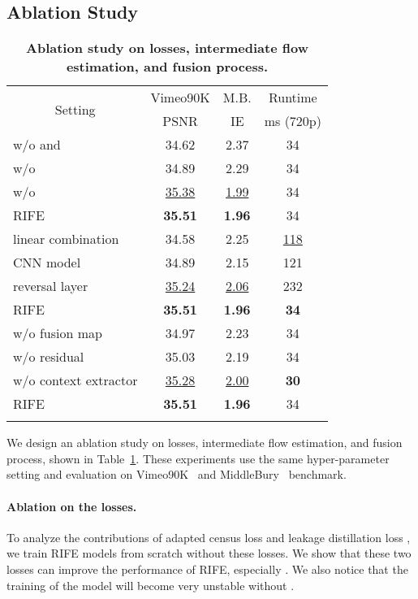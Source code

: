 \documentclass[10pt,twocolumn,letterpaper]{article}
\def\red#1{\textcolor{MyRed}{#1}}
\def\blue#1{\textcolor{MyBlue}{#1}}
\def\first#1{\red{\textbf{#1}}}
\def\second#1{\blue{\underline{#1}}}
\begin{document}
\subsection{Ablation Study}
\label{sec:model_ablation}

\begin{table}[t]
	\caption{\textbf{Ablation study on losses, intermediate flow estimation, and fusion process.}
	}
\label{tab:ablation2}
\small
\begin{tabular}{lccc}
\hline
\multicolumn{1}{c}{\multirow{2}{*}{Setting}} & \multicolumn{1}{c}{Vimeo90K} & \multicolumn{1}{c}{M.B.} & \multicolumn{1}{c}{Runtime} \\ 
\multicolumn{1}{c}{}                         & \multicolumn{1}{c}{PSNR}   & \multicolumn{1}{c}{IE}     & \multicolumn{1}{c}{ms (720p)}            \\ \hline 
w/o  and  & 34.62 & 2.37 & 34\\
w/o  & 34.89 & 2.29 & 34\\
w/o  &   \second{35.38} & \second{1.99} & 34 \\
RIFE & \first{35.51} & \first{1.96} & 34 \\ \hline \hline
linear combination~\cite{jiang2018super} & 34.58 & 2.25 & \second{118} \\
CNN model &  34.89 & 2.15 & 121 \\
reversal layer~\cite{xu2019quadratic} &  \second{35.24} & \second{2.06} & 232 \\
RIFE  & \first{35.51} & \first{1.96} & \first{34} \\ \hline \hline
w/o fusion map & 34.97 & 2.23 &  34 \\
w/o residual & 35.03 & 2.19 &  34 \\
w/o context extractor & \second{35.28} & \second{2.00} & \first{30}\\ 
RIFE & \first{35.51} & \first{1.96} & 34 \\
\hline 
\normalsize
\vspace{-1em}
\end{tabular}
\end{table}


We design an ablation study on losses, intermediate flow estimation, and fusion process, shown in Table~\ref{tab:ablation2}. These experiments use the same hyper-parameter setting and evaluation on Vimeo90K~\cite{xue2019video} and MiddleBury~\cite{baker2011database} benchmark.

\paragraph{Ablation on the losses.} To analyze the contributions of adapted census loss  and leakage distillation loss , we train RIFE models from scratch without these losses. We show that these two losses can improve the performance of RIFE, especially . We also notice that the training of the model will become very unstable without .
\end{document}
